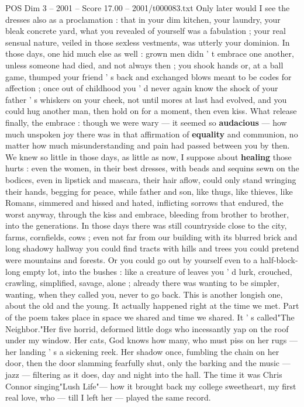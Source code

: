 \begin{textsample}{POS Dim 3 – 2001 – Score 17.00 – 2001/t000083.txt}
Only later would I see the dresses also as a proclamation : that in your dim kitchen, your laundry, your bleak concrete yard, what you revealed of yourself was a fabulation ; your real sensual nature, veiled in those sexless vestments, was utterly your dominion.
In those days, one hid much else as well : grown men didn ' t embrace one another, unless someone had died, and not always then ; you shook hands or, at a ball game, thumped your friend ' s back and exchanged blows meant to be codes for affection ; once out of childhood you ' d never again know the shock of your father ' s whiskers on your cheek, not until mores at last had evolved, and you could hug another man, then hold on for a moment, then even kiss.
What release finally, the embrace : though we were wary — it seemed so \textbf{audacious} — how much unspoken joy there was in that affirmation of \textbf{equality} and communion, no matter how much misunderstanding and pain had passed between you by then.
We knew so little in those days, as little as now, I suppose about \textbf{healing} those hurts : even the women, in their best dresses, with beads and sequins sewn on the bodices, even in lipstick and mascara, their hair aflow, could only stand wringing their hands, begging for peace, while father and son, like thugs, like thieves, like Romans, simmered and hissed and hated, inflicting sorrows that endured, the worst anyway, through the kiss and embrace, bleeding from brother to brother, into the generations.
In those days there was still countryside close to the city, farms, cornfields, cows ; even not far from our building with its blurred brick and long shadowy hallway you could find tracts with hills and trees you could pretend were mountains and forests.
Or you could go out by yourself even to a half-block-long empty lot, into the bushes : like a creature of leaves you ' d lurk, crouched, crawling, simplified, savage, alone ; already there was wanting to be simpler, wanting, when they called you, never to go back.
This is another longish one, about the old and the young.
It actually happened right at the time we met.
Part of the poem takes place in space we shared and time we shared.
It ' s called"The Neighbor."Her five horrid, deformed little dogs who incessantly yap on the roof under my window.
Her cats, God knows how many, who must piss on her rugs — her landing ' s a sickening reek.
Her shadow once, fumbling the chain on her door, then the door slamming fearfully shut, only the barking and the music — jazz — filtering as it does, day and night into the hall.
The time it was Chris Connor singing"Lush Life"— how it brought back my college sweetheart, my first real love, who — till I left her — played the same record.

\end{textsample}
